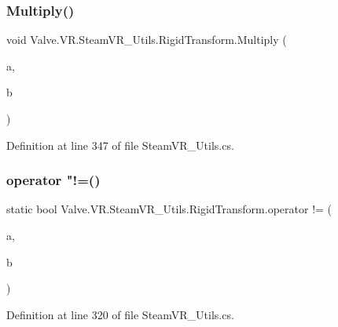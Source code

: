 \subsubsection{\texorpdfstring{Multiply()}{Multiply()}}
{\footnotesize\ttfamily void Valve.\+V\+R.\+Steam\+V\+R\+\_\+\+Utils.\+Rigid\+Transform.\+Multiply (\begin{DoxyParamCaption}\item[{\mbox{\hyperlink{struct_valve_1_1_v_r_1_1_steam_v_r___utils_1_1_rigid_transform}{Rigid\+Transform}}}]{a,  }\item[{\mbox{\hyperlink{struct_valve_1_1_v_r_1_1_steam_v_r___utils_1_1_rigid_transform}{Rigid\+Transform}}}]{b }\end{DoxyParamCaption})}



Definition at line 347 of file Steam\+V\+R\+\_\+\+Utils.\+cs.

\mbox{\label{struct_valve_1_1_v_r_1_1_steam_v_r___utils_1_1_rigid_transform_a44fa2a41bcc6cbcb0bb24fbe124dde02}} 
\subsubsection{\texorpdfstring{operator "!=()}{operator !=()}}
{\footnotesize\ttfamily static bool Valve.\+V\+R.\+Steam\+V\+R\+\_\+\+Utils.\+Rigid\+Transform.\+operator != (\begin{DoxyParamCaption}\item[{\mbox{\hyperlink{struct_valve_1_1_v_r_1_1_steam_v_r___utils_1_1_rigid_transform}{Rigid\+Transform}}}]{a,  }\item[{\mbox{\hyperlink{struct_valve_1_1_v_r_1_1_steam_v_r___utils_1_1_rigid_transform}{Rigid\+Transform}}}]{b }\end{DoxyParamCaption})\hspace{0.3cm}{\ttfamily [static]}}



Definition at line 320 of file Steam\+V\+R\+\_\+\+Utils.\+cs.

\mbox{\label{struct_valve_1_1_v_r_1_1_steam_v_r___utils_1_1_rigid_transform_af46cff34764cf27ee72c5d0c8412f321}} 
